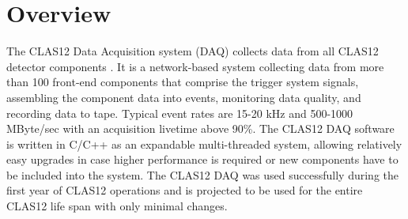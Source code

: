 \section{Overview}

The CLAS12 Data Acquisition system (DAQ) collects data from all CLAS12 detector components \cite{clas-nim}. It is a network-based system collecting data from more than 100 front-end components that comprise the trigger system signals, assembling the component data into events, monitoring data quality, and recording data to tape. Typical event rates are 15-20 kHz and 500-1000 MByte/sec with an acquisition livetime above 90\%. The CLAS12 DAQ software is written in C/C++ as an expandable multi-threaded system, allowing relatively easy upgrades in case higher performance is required or new components have to be included into the system. The CLAS12 DAQ was used successfully during the first year of CLAS12 operations and is projected to be used for the entire CLAS12 life span with only minimal changes.


